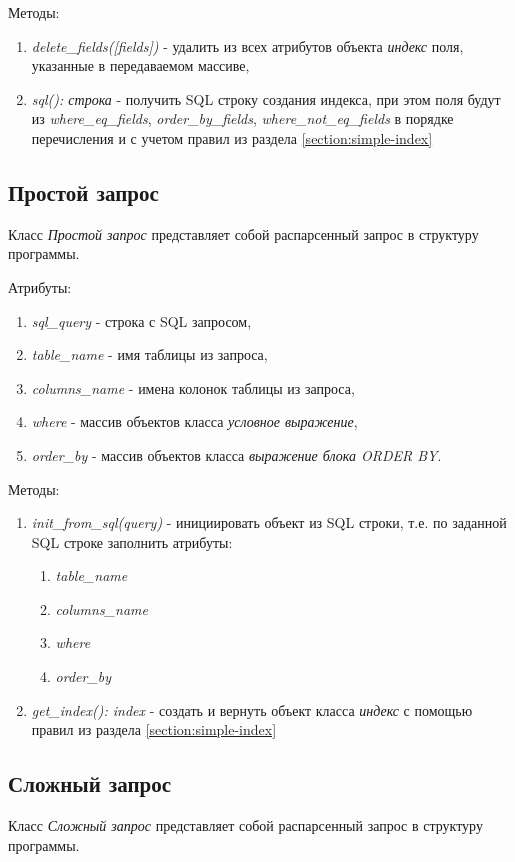 Методы:
\begin{enumerate}
\item \textit{delete_fields([fields])} - удалить из всех атрибутов объекта \textit{индекс} поля, указанные в передаваемом массиве,
\item \textit{sql(): строка} - получить SQL строку создания индекса, при этом поля будут из \textit{where_eq_fields}, \textit{order_by_fields}, \textit{where_not_eq_fields} в порядке перечисления и с учетом правил из раздела \ref{section:simple-index} 
\end{enumerate}


\subsection{Простой запрос}
Класс \textit{Простой запрос} представляет собой распарсенный запрос в структуру программы.

Атрибуты:
\begin{enumerate}
\item \textit{sql_query} - строка с SQL запросом,
\item \textit{table_name} - имя таблицы из запроса,
\item \textit{columns_name} - имена колонок таблицы из запроса,
\item \textit{where} - массив объектов класса \textit{условное выражение},
\item \textit{order_by} - массив объектов класса \textit{выражение блока ORDER BY}.
\end{enumerate}

Методы:
\begin{enumerate}
\item \textit{init_from_sql(query)} - инициировать объект из SQL строки, т.е. по заданной SQL строке заполнить атрибуты: 
	\begin{enumerate}
	\item \textit{table_name} 
	\item \textit{columns_name}
	\item \textit{where}
	\item \textit{order_by}
	\end{enumerate}

\item \textit{get_index(): index} - создать и вернуть объект класса \textit{индекс} с помощью правил из раздела \ref{section:simple-index}
\end{enumerate}


\subsection{Сложный запрос}
Класс \textit{Сложный запрос} представляет собой распарсенный запрос в структуру программы.

